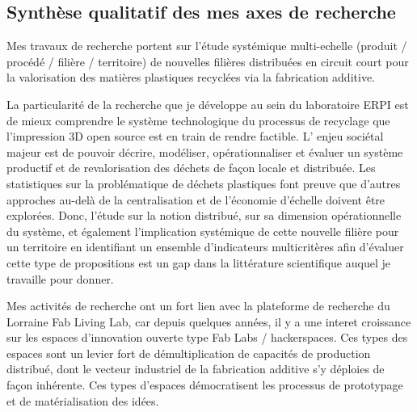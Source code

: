 \documentclass[
  11pt,
]{article}
\begin{document}
\hypertarget{synthuxe8se-qualitatif-des-mes-axes-de-recherche}{%
\subsection{Synthèse qualitatif des mes axes de
recherche}\label{synthuxe8se-qualitatif-des-mes-axes-de-recherche}}

\begin{tcolorbox}[enhanced jigsaw, toprule=.15mm, bottomtitle=1mm, toptitle=1mm, rightrule=.15mm, title=\textcolor{quarto-callout-tip-color}{\faLightbulb}\hspace{0.5em}{En quelque mots}, arc=.35mm, opacityback=0, titlerule=0mm, breakable, colframe=quarto-callout-tip-color-frame, colback=white, colbacktitle=quarto-callout-tip-color!10!white, opacitybacktitle=0.6, left=2mm, leftrule=.75mm, bottomrule=.15mm, coltitle=black]

Mes travaux de recherche portent sur l'étude systémique multi-echelle
(produit / procédé / filière / territoire) de nouvelles filières
distribuées en circuit court pour la valorisation des matières
plastiques recyclées via la fabrication additive.

\end{tcolorbox}

La particularité de la recherche que je développe au sein du laboratoire
ERPI est de mieux comprendre le système technologique du processus de
recyclage que l'impression 3D open source est en train de rendre
factible. L' enjeu sociétal majeur est de pouvoir décrire, modéliser,
opérationnaliser et évaluer un système productif et de revalorisation
des déchets de façon locale et distribuée. Les statistiques sur la
problématique de déchets plastiques font preuve que d'autres approches
au-delà de la centralisation et de l'économie d'échelle doivent être
explorées. Donc, l'étude sur la notion distribué, sur sa dimension
opérationnelle du système, et également l'implication systémique de
cette nouvelle filière pour un territoire en identifiant un ensemble
d'indicateurs multicritères afin d'évaluer cette type de propositions
est un gap dans la littérature scientifique auquel je travaille pour
donner.

Mes activités de recherche ont un fort lien avec la plateforme de
recherche du Lorraine Fab Living Lab, car depuis quelques années, il y a
une interet croissance sur les espaces d'innovation ouverte type Fab
Labs / hackerspaces. Ces types des espaces sont un levier fort de
démultiplication de capacités de production distribué, dont le vecteur
industriel de la fabrication additive s'y déploies de façon inhérente.
Ces types d'espaces démocratisent les processus de prototypage et de
matérialisation des idées.
\end{document}
